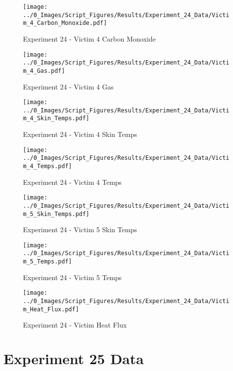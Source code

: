 	\begin{figure}[H]
		\centering
		\texttt{[image: ../0\_Images/Script\_Figures/Results/Experiment\_24\_Data/Victim\_4\_Carbon\_Monoxide.pdf]}
		\caption[]{Experiment 24 - Victim 4 Carbon Monoxide}
	\end{figure}
 
	\clearpage

	\begin{figure}[H]
		\centering
		\texttt{[image: ../0\_Images/Script\_Figures/Results/Experiment\_24\_Data/Victim\_4\_Gas.pdf]}
		\caption[]{Experiment 24 - Victim 4 Gas}
	\end{figure}
 

	\begin{figure}[H]
		\centering
		\texttt{[image: ../0\_Images/Script\_Figures/Results/Experiment\_24\_Data/Victim\_4\_Skin\_Temps.pdf]}
		\caption[]{Experiment 24 - Victim 4 Skin Temps}
	\end{figure}
 
	\clearpage

	\begin{figure}[H]
		\centering
		\texttt{[image: ../0\_Images/Script\_Figures/Results/Experiment\_24\_Data/Victim\_4\_Temps.pdf]}
		\caption[]{Experiment 24 - Victim 4 Temps}
	\end{figure}
 

	\begin{figure}[H]
		\centering
		\texttt{[image: ../0\_Images/Script\_Figures/Results/Experiment\_24\_Data/Victim\_5\_Skin\_Temps.pdf]}
		\caption[]{Experiment 24 - Victim 5 Skin Temps}
	\end{figure}
 
	\clearpage

	\begin{figure}[H]
		\centering
		\texttt{[image: ../0\_Images/Script\_Figures/Results/Experiment\_24\_Data/Victim\_5\_Temps.pdf]}
		\caption[]{Experiment 24 - Victim 5 Temps}
	\end{figure}
 

	\begin{figure}[H]
		\centering
		\texttt{[image: ../0\_Images/Script\_Figures/Results/Experiment\_24\_Data/Victim\_Heat\_Flux.pdf]}
		\caption[]{Experiment 24 - Victim Heat Flux}
	\end{figure}
 
	\clearpage

\clearpage		\large
\section{Experiment 25 Data} \label{App:Exp25Results} 

